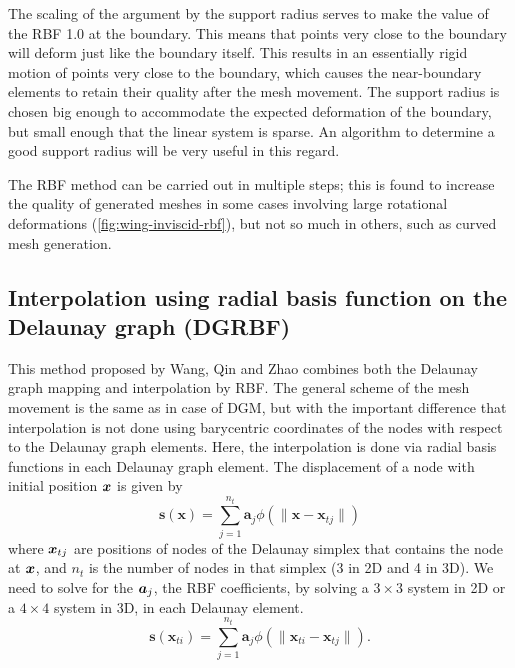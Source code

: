  The scaling of the argument by the support radius serves to make the value of the RBF 1.0 at the boundary. This means that points very close to the boundary will deform just like the boundary itself. This results in an essentially rigid motion of points very close to the boundary, which causes the near-boundary elements to retain their quality after the mesh movement. The support radius is chosen big enough to accommodate the expected deformation of the boundary, but small enough that the linear system is sparse. An algorithm to determine a good support radius will be very useful in this regard.
 
 The RBF method can be carried out in multiple steps; this is found to increase the quality of generated meshes in some cases involving large rotational deformations (\ref{fig:wing-inviscid-rbf}), but not so much in others, such as curved mesh generation.
 
 \subsection[DG-RBF]{Interpolation using radial basis function on the Delaunay graph (DGRBF)}
 This method proposed by Wang, Qin and Zhao \cite{mm:dgrbf} combines both the Delaunay graph mapping and interpolation by RBF. The general scheme of the mesh movement is the same as in case of DGM, but with the important difference that interpolation is not done using barycentric coordinates of the nodes with respect to the Delaunay graph elements. Here, the interpolation is done via radial basis functions in each Delaunay graph element. The displacement of a node with initial position $\boldsymbol{x}$ is given by
 \begin{equation}
 \mathbf{s}(\mathbf{x}) = \sum_{j=1}^{n_t} \mathbf{a}_j \phi(\lVert\mathbf{x} - \mathbf{x}_{tj}\rVert)
 \label{eqn:dgrbf}
 \end{equation}
 where $\boldsymbol{x}_{tj}$ are positions of nodes of the Delaunay simplex that contains the node at $\boldsymbol{x}$, and $n_t$ is the number of nodes in that simplex (3 in 2D and 4 in 3D). We need to solve for the $\boldsymbol{a}_j$, the RBF coefficients, by solving a $3 \times 3$ system in 2D or a $4 \times 4$ system in 3D, in each Delaunay element.
 \begin{equation}
 \mathbf{s}(\mathbf{x}_{ti}) = \sum_{j=1}^{n_t} \mathbf{a}_j \phi(\lVert\mathbf{x}_{ti} - \mathbf{x}_{tj}\rVert).
 \label{eqn:dgrbfsys}
 \end{equation}
 
